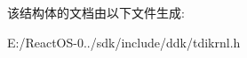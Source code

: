 \begin{DoxyCompactItemize}
\begin{tabbing}
\end{tabbing}\end{DoxyCompactItemize}


该结构体的文档由以下文件生成\+:\begin{DoxyCompactItemize}
\item 
E\+:/\+React\+O\+S-\/0../sdk/include/ddk/tdikrnl.\+h\end{DoxyCompactItemize}
